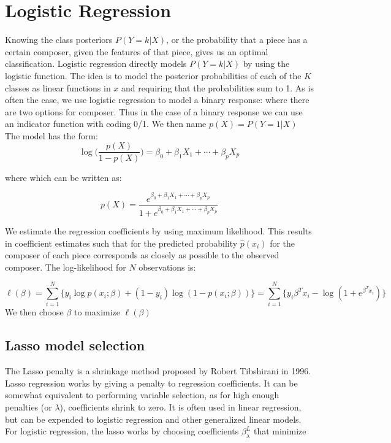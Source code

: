 \documentclass[12pt,twoside]{reedthesis}
\theoremstyle{definition}
\theoremstyle{definition}
\theoremstyle{definition}
\theoremstyle{remark}
\begin{document}
\section{Logistic Regression}\label{logistic-regression}

Knowing the class posteriors \(P(Y = k|X)\), or the probability that a
piece has a certain composer, given the features of that piece, gives us
an optimal classification. Logistic regression directly models
\(P(Y = k|X)\) by using the logistic function. The idea is to model the
posterior probabilities of each of the \(K\) classes as linear functions
in \(x\) and requiring that the probabilities sum to 1. As is often the
case, we use logistic regression to model a binary response: where there
are two options for composer. Thus in the case of a binary response we
can use an indicator function with coding 0/1. We then name
\(p(X) = P(Y=1|X)\) The model has the form:
\[ \log \bigg( \frac{p(X)}{1-p(X)} \bigg) = \beta_0 + \beta_1 X_1 + \cdots + \beta_pX_p\]

where which can be written as:

\[ p(X) = \frac{e^{\beta_0 + \beta_1X_1 + \cdots + \beta_pX_p}}{1 +e^{\beta_0 + \beta_1X_1 + \cdots + \beta_pX_p} }\]

We estimate the regression coefficients by using maximum likelihood.
This results in coefficient estimates such that for the predicted
probability \(\hat{p}(x_i)\) for the composer of each piece corresponds
as closely as possible to the observed composer. The log-likelihood for
\(N\) observations is:

\[ \ell(\beta) = \sum_{i = 1}^N \big\{y_i\log p(x_i;\beta) + (1-y_i)\log(1-p(x_i;\beta))\big\} = \sum_{i = 1}^N \big\{y_i\beta^Tx_i - \log(1 + e^{\beta^Tx_i})\big\}\]
We then choose \(\beta\) to maximize \(\ell(\beta)\)

\subsection{Lasso model selection}\label{lasso-model-selection}

The Lasso penalty is a shrinkage method proposed by Robert Tibshirani in
1996. Lasso regression works by giving a penalty to regression
coefficients. It can be somewhat equivalent to performing variable
selection, as for high enough penalties (or \(\lambda\)), coefficients
shrink to zero. It is often used in linear regression, but can be
expended to logistic regression and other generalized linear models. For
logistic regression, the lasso works by choosing coefficients
\(\beta_\lambda^L\) that minimize
\end{document}
